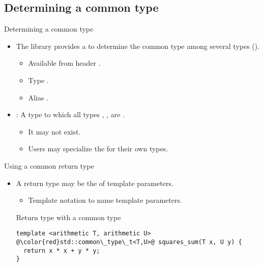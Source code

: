 \subsection{Determining a common type}

\begin{frame}[t,fragile]{Determining a common type}
\begin{itemize}
  \item The library provides a  to determine
        the common type among several types ().
    \begin{itemize}
      \item Available from header .
      \item Type .
      \item Alias .
    \end{itemize}

  \item {}:
        A type to which all types , , \cppid{\ldots} are 
        .
    \begin{itemize}
      \item It may not exist.
      \item Users may specialize the  for their own types.
    \end{itemize}
\end{itemize}
\end{frame}

\begin{frame}[t,fragile]{Using a common return type}
\begin{itemize}
  \item A return type may be the  of template parameters.
    \begin{itemize}
      \item Template notation  to name template parameters.
    \end{itemize}

\begin{block}{Return type with a common type}
\begin{lstlisting}[escapechar=@]
template <arithmetic T, arithmetic U>
@\color{red}std::common\_type\_t<T,U>@ squares_sum(T x, U y) {
  return x * x + y * y;
}
\end{lstlisting}
\end{block}

\end{itemize}
\end{frame}
